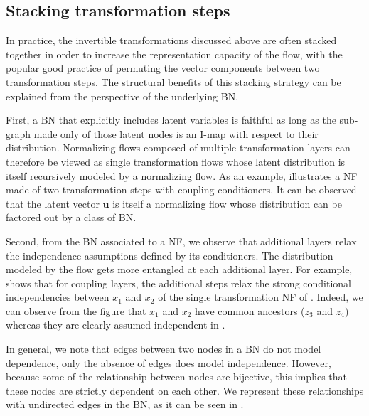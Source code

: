 \subsection{Stacking transformation steps} \label{sec:multiple-step-flow-as-BN}


In practice, the invertible transformations discussed above are often stacked together in order to increase the representation capacity of the flow, with the popular good practice of permuting the vector components between two transformation steps.
The structural benefits of this stacking strategy can be explained from the perspective of the underlying BN.

First, a BN that explicitly includes latent variables is faithful as long as the sub-graph made only of those latent nodes is an I-map with respect to their distribution.
Normalizing flows composed of multiple transformation layers can therefore be viewed as single transformation flows whose latent distribution is itself recursively modeled by a normalizing flow.
As an example,  illustrates a NF made of two transformation steps with coupling conditioners. It can be observed that the latent vector $\mathbf{u}$ is itself a normalizing flow  whose distribution can be factored out by a class of BN.

Second, from the BN associated to a NF, we observe that additional layers relax the independence assumptions defined by its conditioners.
The distribution modeled by the flow gets more entangled at each additional layer.
For example,  shows that for coupling layers, the additional steps relax the strong conditional independencies between $x_1$ and $x_2$ of the single transformation NF of .
Indeed, we can observe from the figure that $x_1$ and $x_2$ have common ancestors ($z_3$ and $z_4$) whereas they are clearly assumed independent in .

In general, we note that edges between two nodes in a BN do not model dependence, only the absence of edges does model independence. However, because some of the relationship between nodes are bijective, this implies that these nodes are strictly dependent on each other. We represent these relationships with undirected edges in the BN, as it can be seen in .



